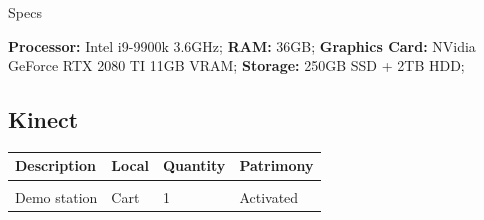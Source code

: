 {\Large Specs}
\vspace{1em}

\textbf{Processor:} Intel i9-9900k 3.6GHz; \textbf{RAM:} 36GB; \textbf{Graphics Card:} NVidia GeForce RTX 2080 TI 11GB VRAM; \textbf{Storage:} 250GB SSD + 2TB HDD;
\newpage

\subsection{Kinect}
\begin{tabularx}{\textwidth}{ Y  Y  Y  Y }
    \textbf{Description} &  \textbf{Local} &  \textbf{Quantity} & \textbf{Patrimony}\\
    \hline \\
     Demo station & Cart & 1 & Activated
\end{tabularx}
\vspace{1cm}

